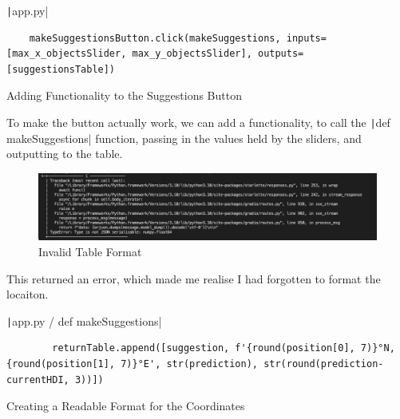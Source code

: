 \documentclass[12pt]{report}
\newcommand{\pil}[1]{\protect\texttt|#1|}
\begin{document}
\begin{listing}[H]
\pil{app.py}
\begin{verbatim}
    makeSuggestionsButton.click(makeSuggestions, inputs=[max_x_objectsSlider, max_y_objectsSlider], outputs=[suggestionsTable])
\end{verbatim}
\caption{Adding Functionality to the Suggestions Button}\label{cs:functionalityToSuggestionsButton}
\end{listing}

To make the button actually work, we can add a functionality, to call the \pil{def makeSuggestions} function, passing in the values held by the sliders, and outputting to the table.

\begin{center}
\end{center}

\begin{figure}[H]
\centering
\includegraphics[width=13cm]{ss13.2.png}
\caption{Invalid Table Format}\label{fig:ss13.2}
\end{figure}

This returned an error, which made me realise I had forgotten to format the locaiton.

\begin{listing}[H]
\pil{app.py / def makeSuggestions}
\begin{verbatim}
        returnTable.append([suggestion, f'{round(position[0], 7)}°N, {round(position[1], 7)}°E', str(prediction), str(round(prediction-currentHDI, 3))])
\end{verbatim}
\caption{Creating a Readable Format for the Coordinates}\label{cs:readableCoordinates}
\end{listing}
\end{document}

